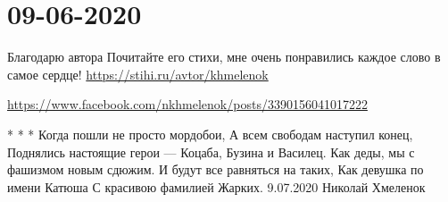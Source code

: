  
 
 
 
 
\section{09-06-2020}

Благодарю автора 
Почитайте его стихи, мне очень понравились каждое слово в самое сердце!
\url{https://stihi.ru/avtor/khmelenok}

\url{https://www.facebook.com/nkhmelenok/posts/3390156041017222}

* * * 
Когда пошли не просто мордобои,
А всем свободам наступил конец,
Поднялись настоящие герои —
Коцаба, Бузина и Василец.
Как деды, мы с фашизмом новым сдюжим.
И будут все равняться на таких,
Как девушка по имени Катюша
С красивою фамилией Жарких.
9.07.2020
Николай Хмеленок
